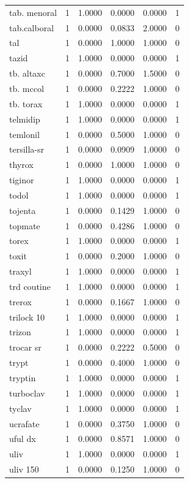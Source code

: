 \begin{longtable}{p{3.0cm}rrrrr}
tab. menoral & 1 & 1.0000 & 0.0000 & 0.0000 & 1 \\
tab.calboral & 1 & 0.0000 & 0.0833 & 2.0000 & 0 \\
tal & 1 & 0.0000 & 1.0000 & 1.0000 & 0 \\
tazid & 1 & 1.0000 & 0.0000 & 0.0000 & 1 \\
tb. altaxc & 1 & 0.0000 & 0.7000 & 1.5000 & 0 \\
tb. mccol & 1 & 0.0000 & 0.2222 & 1.0000 & 0 \\
tb. torax & 1 & 1.0000 & 0.0000 & 0.0000 & 1 \\
telmidip & 1 & 1.0000 & 0.0000 & 0.0000 & 1 \\
temlonil & 1 & 0.0000 & 0.5000 & 1.0000 & 0 \\
tersilla-sr & 1 & 0.0000 & 0.0909 & 1.0000 & 0 \\
thyrox & 1 & 0.0000 & 1.0000 & 1.0000 & 0 \\
tiginor & 1 & 1.0000 & 0.0000 & 0.0000 & 1 \\
todol & 1 & 1.0000 & 0.0000 & 0.0000 & 1 \\
tojenta & 1 & 0.0000 & 0.1429 & 1.0000 & 0 \\
topmate & 1 & 0.0000 & 0.4286 & 1.0000 & 0 \\
torex & 1 & 1.0000 & 0.0000 & 0.0000 & 1 \\
toxit & 1 & 0.0000 & 0.2000 & 1.0000 & 0 \\
traxyl & 1 & 1.0000 & 0.0000 & 0.0000 & 1 \\
trd coutine & 1 & 1.0000 & 0.0000 & 0.0000 & 1 \\
trerox & 1 & 0.0000 & 0.1667 & 1.0000 & 0 \\
trilock 10 & 1 & 1.0000 & 0.0000 & 0.0000 & 1 \\
trizon & 1 & 1.0000 & 0.0000 & 0.0000 & 1 \\
trocar sr & 1 & 0.0000 & 0.2222 & 0.5000 & 0 \\
trypt & 1 & 0.0000 & 0.4000 & 1.0000 & 0 \\
tryptin & 1 & 1.0000 & 0.0000 & 0.0000 & 1 \\
turboclav & 1 & 1.0000 & 0.0000 & 0.0000 & 1 \\
tyclav & 1 & 1.0000 & 0.0000 & 0.0000 & 1 \\
ucrafate & 1 & 0.0000 & 0.3750 & 1.0000 & 0 \\
uful dx & 1 & 0.0000 & 0.8571 & 1.0000 & 0 \\
uliv & 1 & 1.0000 & 0.0000 & 0.0000 & 1 \\
uliv 150 & 1 & 0.0000 & 0.1250 & 1.0000 & 0 \\

\end{longtable}
